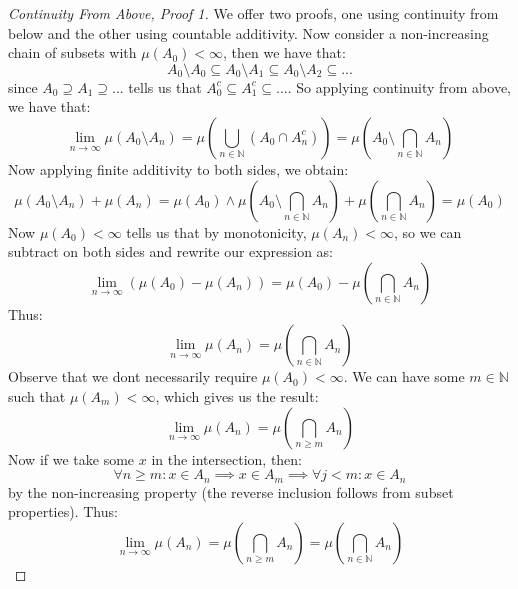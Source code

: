 \documentclass[10pt,letterpaper]{article} %
\begin{document}
\begin{proof}[Continuity From Above, Proof 1]
We offer two proofs, one using continuity from below and the other using countable additivity. Now consider a non-increasing chain of subsets with $\mu(A_0) < \infty$, then we have that:
\begin{equation*}
A_0 \setminus A_0 \subseteq A_0 \setminus A_1 \subseteq A_0 \setminus A_2 \subseteq ...
\end{equation*}
since $A_0 \supseteq A_1 \supseteq ...$ tells us that $A_0^c \subseteq A_1^c \subseteq ...$. So applying continuity from above, we have that:
\begin{equation*}
\lim_{n \xrightarrow{} \infty}\mu(A_0 \setminus A_n) = \mu\left(\bigcup_{n \in \mathbb{N}}(A_0 \cap A_n^c)\right) = \mu\left(A_0 \setminus \bigcap_{n \in \mathbb{N}}A_n\right)
\end{equation*}
Now applying finite additivity to both sides, we obtain:
\begin{equation*}
\mu(A_0 \setminus A_n) + \mu(A_n) = \mu(A_0) \land \mu\left(A_0 \setminus \bigcap_{n \in \mathbb{N}}A_n\right) + \mu\left(\bigcap_{n \in \mathbb{N}}A_n\right) = \mu(A_0)
\end{equation*}
Now $\mu(A_0) < \infty$ tells us that by monotonicity, $\mu(A_n) < \infty$, so we can subtract on both sides and rewrite our expression as:
\begin{equation*}
\lim_{n \xrightarrow{} \infty}(\mu(A_0) - \mu(A_n)) = \mu(A_0) - \mu\left(\bigcap_{n \in \mathbb{N}}A_n\right)
\end{equation*}
Thus:
\begin{equation*}
\lim_{n \xrightarrow{} \infty}\mu(A_n) = \mu\left(\bigcap_{n \in \mathbb{N}}A_n\right)
\end{equation*}
Observe that we dont necessarily require $\mu(A_0) < \infty$. We can have some $m \in \mathbb{N}$ such that $\mu(A_m) < \infty$, which gives us the result:
\begin{equation*}
\lim_{n \xrightarrow{} \infty}\mu(A_n) = \mu\left(\bigcap_{n \geqslant m}A_n\right)
\end{equation*}
Now if we take some $x$ in the intersection, then:
\begin{equation*}
\forall n \geqslant m: x \in A_n \implies x \in A_m \implies \forall j < m: x \in A_n
\end{equation*}
by the non-increasing property (the reverse inclusion follows from subset properties). Thus:
\begin{equation*}
\lim_{n \xrightarrow{} \infty}\mu(A_n) = \mu\left(\bigcap_{n \geqslant m}A_n\right) = \mu\left(\bigcap_{n \in \mathbb{N}}A_n\right)
\end{equation*}
\end{proof}
\end{document}
